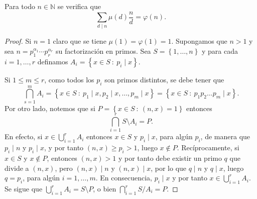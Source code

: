 \begin{proposition}\label{prop:mob1}
Para todo $n\in\mathbb{N}$ se verifica que 
\begin{equation*}
	\sum_{d \mid n} \mu(d)\frac{n}{d}=\varphi(n).
\end{equation*}
\end{proposition}
\begin{proof}
Si $n=1$ claro que se tiene $\mu(1)=\varphi(1)=1$. Supongamos que $n>1$ y sea $n=p_1^{\alpha_1}\cdots p_r^{\alpha_r}$ su factorización en primos. Sea $S=\left\{1,\ldots,n\right\}$ y para cada $i=1,\ldots,r$ definamos $A_i=\left\{x\in S\: : \: p_i \mid x\right\}$.
\bigskip

Si $1\leq m\leq r$, como todos los $p_i$ son primos distintos, se debe tener que 
\begin{equation*}
	\bigcap_{s=1}^{m} A_i = \left\{x\in S \: : \: p_1 \mid x,p_2 \mid x,\ldots,p_m \mid x\right\}=\left\{x\in S \: : \: p_1 p_2 \ldots p_m \mid x\right\}.
\end{equation*}
Por otro lado, notemos que si $P=\left\{x\in S \: : \: (n,x)=1\right\}$ entonces 
\begin{equation*}
	\bigcap_{i=1}^{r} S \setminus A_i=P.
\end{equation*}
En efecto, si $x\in \bigcup_{i=1}^{r} A_i$ entonces $x\in S$ y $p_i \mid x$, para algún $p_i$, de manera que $p_i \mid n$ y $p_i \mid x$, y por tanto $(n,x)\geq p_i>1$, luego $x\not\in P$. Recíprocamente, si $x\in S$ y $x\not\in P$, entonces $(n,x)>1$ y por tanto debe existir un primo $q$ que divide a $(n,x)$, pero $(n,x)\mid n$ y $(n,x)\mid x$, por lo que $q \mid n$ y $q \mid x$, luego $q=p_i$, para algún $i=1,\ldots,m$. En consecuencia, $p_i \mid x$ y por tanto $x\in \bigcup_{i=1}^{r} A_i$. Se sigue que $\bigcup_{i=1}^{r} A_i=S \setminus P$, o bien $\bigcap_{i=1}^{r} S/A_i=P$.
\bigskip


\end{proof}
